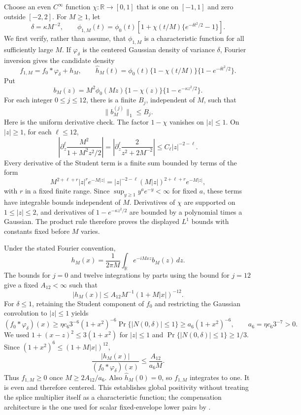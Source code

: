 Choose an even \(C^\infty\) function \(\chi:\mathbb R\to[0,1]\) that is one on \([-1,1]\) and zero outside \([-2,2]\).  For \(M\ge1\), let
\[
 \delta=\kappa M^{-2},\qquad
 \phi_{1,M}(t)=\phi_0(t)\left[1+\chi(t/M)
 \{e^{-\delta t^2/2}-1\}\right].
\]
We first verify, rather than assume, that \(\phi_{1,M}\) is a characteristic function for all sufficiently large \(M\).  If \(\varphi_\delta\) is the centered Gaussian density of variance \(\delta\), Fourier inversion gives the candidate density
\[
 f_{1,M}=f_0*\varphi_\delta+h_M,
 \qquad
 \widehat h_M(t)=\phi_0(t)\{1-\chi(t/M)\}
                    \{1-e^{-\delta t^2/2}\}.
\]
Put
\[
 b_M(z)=M^2\phi_0(Mz)\{1-\chi(z)\}
                    \{1-e^{-\kappa z^2/2}\}.
\]
For each integer \(0\le j\le12\), there is a finite \(B_j\), independent of \(M\), such that
\[
 \|b_M^{(j)}\|_1\le B_j. 
\]
Here is the uniform derivative check.  The factor \(1-\chi\) vanishes on \(|z|\le1\).  On \(|z|\ge1\), for each \(\ell\le12\),
\[
 \left|\partial_z^\ell\frac{M^2}{1+M^2z^2/2}\right|
 =\left|\partial_z^\ell\frac{2}{z^2+2M^{-2}}\right|
 \le C_\ell |z|^{-2-\ell}.
\]
Every derivative of the Student term is a finite sum bounded by terms of the form
\[
 M^{2+\ell+r}|z|^r e^{-M|z|}
 =|z|^{-2-\ell}(M|z|)^{2+\ell+r}e^{-M|z|},
\]
with \(r\) in a fixed finite range.  Since \(\sup_{y\ge1}y^a e^{-y}<\infty\) for fixed \(a\), these terms have integrable bounds independent of \(M\).  Derivatives of \(\chi\) are supported on \(1\le|z|\le2\), and derivatives of \(1-e^{-\kappa z^2/2}\) are bounded by a polynomial times a Gaussian.  The product rule therefore proves the displayed \(L^1\) bounds with constants fixed before \(M\) varies.

Under the stated Fourier convention,
\[
 h_M(x)=\frac1{2\pi M}\int_{\mathbb R}e^{-iMxz}b_M(z)\,dz.
\]
The bounds for \(j=0\) and twelve integrations by parts using the bound for \(j=12\) give a fixed \(A_{12}<\infty\) such that
\[
 |h_M(x)|\le A_{12}M^{-1}(1+M|x|)^{-12}.
\]
For \(\delta\le1\), retaining the Student component of \(f_0\) and restricting the Gaussian convolution to \(|z|\le1\) yields
\[
 (f_0*\varphi_\delta)(x)
 \ge \eta c_6 3^{-6}(1+x^2)^{-6}
      \Pr\{|N(0,\delta)|\le1\}
 \ge a_6(1+x^2)^{-6},
 \qquad a_6=\eta c_6 3^{-7}>0.
\]
We used \(1+(x-z)^2\le3(1+x^2)\) for \(|z|\le1\) and \(\Pr\{|N(0,\delta)|\le1\}\ge1/3\).  Since \((1+x^2)^6\le(1+M|x|)^{12}\),
\[
 \frac{|h_M(x)|}{(f_0*\varphi_\delta)(x)}
 \le\frac{A_{12}}{a_6M}.
\]
Thus \(f_{1,M}\ge0\) once \(M\ge2A_{12}/a_6\).  Also \(\widehat h_M(0)=0\), so \(f_{1,M}\) integrates to one.  It is even and therefore centered.  This establishes global positivity without treating the splice multiplier itself as a characteristic function; the compensation architecture is the one used for scalar fixed-envelope lower pairs by \cite{Meister2006}.

